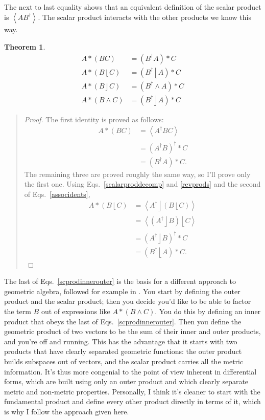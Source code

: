 \documentclass{utarticle}
\DeclareMathOperator{\lin}{\rfloor}
\DeclareMathOperator{\rin}{\lfloor}
\DeclareMathOperator{\out}{\wedge}
\newcommand{\rev}[1]{\ensuremath{#1^\dagger}}
\newcommand{\scprod}[2]{\ensuremath{#1 * #2}}
\newcommand{\grade}[2][]{\ensuremath{\left\langle #2 \right\rangle_{#1}}}
\newtheorem{thm}{Theorem}
\newcommand{\bp}{\begin{quotation} \begin{proof}}
\newcommand{\ep}{\end{proof} \end{quotation}}
\begin{document}
The next to last equality shows that an equivalent definition of the scalar product is 
\grade{A\rev{B}}.  The scalar product interacts with the other products we know this way.
\begin{thm}
\begin{align}
\scprod{A}{(BC)} & = \scprod{(\rev{B} A)}{C} \nonumber \\
\scprod{A}{(B \rin C)} & = \scprod{(\rev{B} \rin A)}{C} \nonumber \\
\scprod{A}{(B \lin C)} & = \scprod{(\rev{B} \out A)}{C} \nonumber \\
\scprod{A}{(B \out C)} & = \scprod{(\rev{B} \lin A)}{C}
\label{scprodinnerouter}
\end{align}
\label{scprodinoutidents}
\end{thm}
\bp
The first identity is proved as follows:
\begin{align}
\scprod{A}{(BC)} & = \grade{\rev{A} BC} \nonumber \\
                 & = \scprod{\rev{(\rev{A} B)}}{C} \nonumber \\
                 & = \scprod{(\rev{B} A)}{C}.
\end{align}
The remaining three are proved roughly the same way, so I'll prove 
only the first one.  Using Eqs.~\eqref{scalarproddecomp} and 
\eqref{revprods} and the second of Eqs.~\eqref{associdents},
\begin{align}
\scprod{A}{(B \rin C)} & = \grade{\rev{A} \lin (B \rin C)} \nonumber \\
                       & = \grade{(\rev{A} \lin B) \rin C} \nonumber \\
                       & = \scprod{\rev{(\rev{A} \lin B)}}{C} \nonumber \\
                       & = \scprod{(\rev{B} \rin A)}{C}.
\end{align}
\ep

The last of Eqs.~\eqref{scprodinnerouter} is the basis for a different approach to 
geometric algebra, followed for example in \cite{GAforCS}.  You start by defining the 
outer product and the scalar product; then you decide you'd like to be able to factor the 
term $B$ out of expressions like $\scprod{A}{(B \out C)}$.  You do this by defining an 
inner product that obeys the last of Eqs.~\eqref{scprodinnerouter}.  Then you define 
the geometric product of two vectors to be the sum of their inner and outer products,
and you're off and running.  This has the advantage that it starts with two products that
have clearly separated geometric functions: the outer product builds subspaces out of 
vectors, and the scalar product carries all the metric information.  It's thus more congenial
to the point of view inherent in differential forms, which are built using only an outer 
product and which clearly separate metric and non-metric properties.  Personally, I 
think it's cleaner to start with the fundamental product and define every other product 
directly in terms of it, which is why I follow the approach given here.
\end{document}
